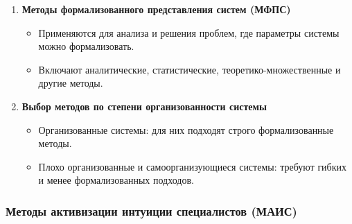 \documentclass[
]{article}
\providecommand{\tightlist}{%
  \setlength{\itemsep}{0pt}\setlength{\parskip}{0pt}}
\begin{document}
\begin{enumerate}
\def\labelenumi{\arabic{enumi}.}
\item
  \textbf{Методы формализованного представления систем (МФПС)}

  \begin{itemize}
  \tightlist
  \item
    Применяются для анализа и решения проблем, где параметры системы
    можно формализовать.
  \item
    Включают аналитические, статистические, теоретико-множественные и
    другие методы.
  \end{itemize}
\item
  \textbf{Выбор методов по степени организованности системы}

  \begin{itemize}
  \tightlist
  \item
    Организованные системы: для них подходят строго формализованные
    методы.
  \item
    Плохо организованные и самоорганизующиеся системы: требуют гибких и
    менее формализованных подходов.
  \end{itemize}
\end{enumerate}

\subsubsection{\texorpdfstring{\textbf{Методы активизации интуиции
специалистов
(МАИС)}}{Методы активизации интуиции специалистов (МАИС)}}\label{ux43cux435ux442ux43eux434ux44b-ux430ux43aux442ux438ux432ux438ux437ux430ux446ux438ux438-ux438ux43dux442ux443ux438ux446ux438ux438-ux441ux43fux435ux446ux438ux430ux43bux438ux441ux442ux43eux432-ux43cux430ux438ux441}
\end{document}
